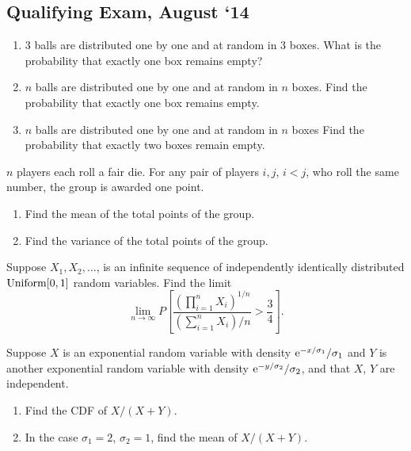\subsection{Qualifying Exam, August `14}
\begin{problem}
  \hfill
  \begin{enumerate}[label=(\alph*),noitemsep]
  \item \(3\) balls are distributed one by one and at random in \(3\)
    boxes. What is the probability that exactly one box remains empty?
  \item \(n\) balls are distributed one by one and at random in \(n\)
    boxes. Find the probability that exactly one box remains empty.
  \item \(n\) balls are distributed one by one and at random in \(n\)
    boxes Find the probability that exactly two boxes remain empty.
  \end{enumerate}
\end{problem}
\begin{solution*}
\end{solution*}

\begin{problem}
  \(n\) players each roll a fair die. For any pair of players \(i,j\),
  \(i<j\), who roll the same number, the group is awarded one point.
  \begin{enumerate}[label=(\alph*),noitemsep]
  \item Find the mean of the total points of the group.
  \item Find the variance of the total points of the group.
  \end{enumerate}
\end{problem}
\begin{solution*}
\end{solution*}

\begin{problem}
  Suppose \(X_1,X_2,\dotsc\), is an infinite sequence of independently
  identically distributed \(\operatorname{Uniform}[0,1]\) random variables. Find the
  limit
  \[
    \lim_{n\to\infty} P%
    \left[%
      \frac{\left(\prod_{i=1}^n X_i\right)^{1/n}}
      {\left(\sum_{i=1}^nX_i\right)/n}>\frac{3}{4}%
    \right].
  \]
\end{problem}
\begin{solution*}
\end{solution*}

\begin{problem}
  Suppose \(X\) is an exponential random variable with density
  \(\mathrm{e}^{-x/\sigma_1}/\sigma_1\) and \(Y\) is another exponential random
  variable with density \(\mathrm{e}^{-y/\sigma_2}/\sigma_2\), and that \(X\), \(Y\)
  are independent.
  \begin{enumerate}[label=(\alph*),noitemsep]
  \item Find the CDF of \(X/(X+Y)\).
  \item In the case \(\sigma_1=2\), \(\sigma_2=1\), find the mean of
    \(X/(X+Y)\).
  \end{enumerate}
\end{problem}
\begin{solution*}
\end{solution*}


